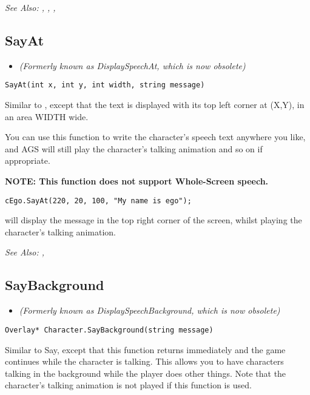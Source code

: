 \it{See Also:} , ,
,


\subsection{SayAt}\label{Character.SayAt}%

\begin{itemize}
\item \it{(Formerly known as DisplaySpeechAt, which is now obsolete)}
\end{itemize}

\begin{verbatim}
SayAt(int x, int y, int width, string message)
\end{verbatim}
Similar to , except that the text is displayed with its top
left corner at (X,Y), in an area WIDTH wide.

You can use this function to write the character's speech text anywhere you like, and
AGS will still play the character's talking animation and so on if appropriate.

\bf{NOTE:} This function does not support Whole-Screen speech.

\begin{verbatim}
cEgo.SayAt(220, 20, 100, "My name is ego");
\end{verbatim}
will display the message in the top right corner of the screen, whilst playing the
character's talking animation.

\it{See Also:} ,


\subsection{SayBackground}\label{Character.SayBackground}%

\begin{itemize}
\item \it{(Formerly known as DisplaySpeechBackground, which is now obsolete)}
\end{itemize}

\begin{verbatim}
Overlay* Character.SayBackground(string message)
\end{verbatim}
Similar to Say, except that this function returns immediately
and the game continues while the character is talking. This allows you
to have characters talking in the background while the player does other
things. Note that the character's talking animation is not played if this
function is used.

